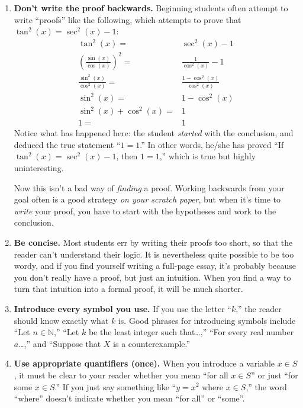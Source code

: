 \documentclass[11pt]{article}
\begin{document}
\begin{enumerate}
\item \textbf{Don't write the proof backwards.}
        Beginning students often attempt to write ``proofs'' like the following, which attempts to prove that $\tan^2(x)  = \sec^2(x) - 1$:
\begin{align*}
 \tan^2(x) =& \sec^2(x) - 1 \\
\left(\frac{\sin(x)}{\cos(x)}\right)^2 =& \frac{1}{\cos^2(x)} - 1 \\
\frac{\sin^2(x)}{\cos^2(x)} =&  \frac{1-\cos^2(x)}{\cos^2(x)} \\
\sin^2(x) =& 1-\cos^2(x) \\
\sin^2(x) + \cos^2(x) =& 1 \\
1 =& 1
\end{align*}        
        Notice what has happened here:  the student \emph{started} with the conclusion,
        and deduced the true statement ``$1=1$.''
        In other words, he/she has proved ``If $\tan^2(x) = \sec^2(x) - 1$, then $1=1$,''
        which is true but highly uninteresting.
        
        Now this isn't a bad way of \emph{finding} a proof.
        Working backwards from your goal often is a good strategy \emph{on your scratch paper},
        but when it's time to \emph{write} your proof,
        you have to start with the hypotheses and work to the conclusion.

\item \textbf{Be concise.}
        Most students err by writing their proofs too short,
        so that the reader can't understand their logic.
        It is nevertheless quite possible to be too wordy,
        and if you find yourself writing a full-page essay,
        it's probably because you don't really have a proof,
        but just an intuition.
        When you find a way to turn that intuition into a formal proof,
        it will be much shorter.

\item \textbf{Introduce every symbol you use.}
        If you use the letter ``$k$,'' the reader should know exactly what $k$ is.
        Good phrases for introducing symbols include
          ``Let $n\in \mathbb{N}$,''
          ``Let $k$ be the least integer such that\ldots,''
          ``For every real number $a$\ldots,''
          and
          ``Suppose that $X$ is a counterexample.''
          
\item \textbf{Use appropriate quantifiers (once).}
        When you introduce a variable $x\in S$, 
        it must be clear to your reader whether you mean ``for all $x\in S$''
        or just ``for some $x\in S$.''
        If you just say something like ``$y=x^2$ where $x\in S$,''
        the word ``where'' doesn't indicate whether you mean ``for all'' or ``some''.
        

\end{enumerate}
\end{document}
